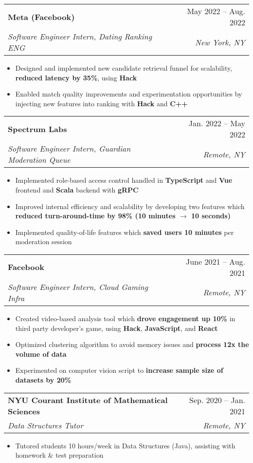 \documentclass[letterpaper,11pt]{article}
\makeatletter
\newcommand{\resumeItem}[1]{
  \item\small{
    {#1 \vspace{-2pt}}
  }
}
\newcommand{\resumeSubheading}[4]{
  \vspace{-2pt}\item
    \begin{tabular*}{0.97\textwidth}[t]{l@{\extracolsep{\fill}}r}
      \textbf{#1} & #2 \\
      \textit{\small#3} & \textit{\small #4} \\
    \end{tabular*}\vspace{-7pt}
}
\newcommand{\resumeSubSubheading}[2]{
    \item
    \begin{tabular*}{0.97\textwidth}{l@{\extracolsep{\fill}}r}
      \textit{\small#1} & \textit{\small #2} \\
    \end{tabular*}\vspace{-7pt}
}
\newcommand{\resumeSubHeadingListEnd}{\end{itemize}}
\newcommand{\resumeItemListStart}{\begin{itemize}}
\newcommand{\resumeItemListEnd}{\end{itemize}\vspace{-5pt}}
\makeatother
\begin{document}

    \resumeSubheading
      {Meta (Facebook)}{May 2022 -- Aug. 2022}
      {Software Engineer Intern, Dating Ranking ENG}{New York, NY}
      \resumeItemListStart
        \resumeItem{Designed and implemented new candidate retrieval funnel for scalability, \textbf{reduced latency by 35\%}, using \textbf{Hack}}
        \resumeItem{Enabled match quality improvements and experimentation opportunities by injecting new features into ranking with \textbf{Hack} and \textbf{C++}}
    \resumeItemListEnd

    \resumeSubheading
      {Spectrum Labs}{Jan. 2022 -- May 2022}
      {Software Engineer Intern, Guardian Moderation Queue}{Remote, NY}
      \resumeItemListStart
        \resumeItem{Implemented role-based access control handled in \textbf{TypeScript} and \textbf{Vue} frontend and \textbf{Scala} backend with \textbf{gRPC}}
        \resumeItem{Improved internal efficiency and scalability by developing two features which \textbf{reduced turn-around-time by 98\% (10 minutes $\rightarrow$ 10 seconds)}}
        \resumeItem{Implemented quality-of-life features which \textbf{saved users 10 minutes} per moderation session}
      \resumeItemListEnd

    \resumeSubheading
      {Facebook}{June 2021 -- Aug. 2021}
      {Software Engineer Intern, Cloud Gaming Infra}{Remote, NY}
      \resumeItemListStart
        \resumeItem{Created video-based analysis tool which \textbf{drove engagement up 10\%} in third party developer's game, using \textbf{Hack}, \textbf{JavaScript}, and \textbf{React}}
        \resumeItem{Optimized clustering algorithm to avoid memory issues and \textbf{process 12x the volume of data}}
        \resumeItem{Experimented on computer vision script to \textbf{increase sample size of datasets by 20\%}}
      \resumeItemListEnd

    \resumeSubheading
      {NYU Courant Institute of Mathematical Sciences}{Sep. 2020 -- Jan. 2021}
      {Data Structures Tutor}{Remote, NY}
      \resumeItemListStart
        \resumeItem{Tutored students 10 hours/week in Data Structures (Java), assisting with homework \& test preparation}
      \resumeItemListEnd
\end{document}
